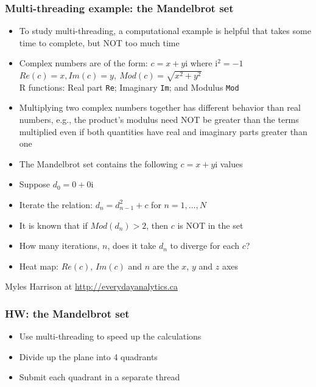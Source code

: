 \documentclass[11pt,pdftex,dvipsnames,usenames,helvetica]{beamer}
\begin{document}
\begin{frame}[fragile]
\frametitle{Multi-threading example: the Mandelbrot set}

\begin{itemize}
\item To study multi-threading, a computational
example is helpful that takes some time to complete, but NOT too much time
\item Complex numbers are of the form: $c=x+y\mathrm{i}$
where $\mathrm{i}^2=-1$\\
$Re(c)=x, Im(c)=y,\ Mod(c)=\sqrt{x^2+y^2}$\\
R functions: Real part {\tt Re}; Imaginary {\tt Im}; and Modulus {\tt Mod}
\item Multiplying two complex numbers together has
  different behavior than real numbers, e.g., the product's modulus 
 need NOT be greater than the terms multiplied
  even if both quantities have real and imaginary parts greater than one
\item The Mandelbrot set contains the following $c=x+y\mathrm{i}$ values
\item Suppose $d_0=0+0\mathrm{i}$
\item Iterate the relation: $d_{n}=d_{n-1}^2+c$ for $n=1, \dots, N$ 
\item It is known that if $Mod(d_n)>2$, then $c$ is NOT in the set
\item How many iterations, $n$, does it take $d_n$ to
  diverge for each $c$?
\item Heat map: $Re(c)$, $Im(c)$ and $n$ are the $x$, $y$ and $z$ axes
\end{itemize}
Myles Harrison at \url{http://everydayanalytics.ca}
\end{frame}

\begin{frame}[fragile]
\frametitle{HW: the Mandelbrot set}

\begin{itemize}
\item Use multi-threading to speed up the calculations
\item Divide up the plane into 4 quadrants
\item Submit each quadrant in a separate thread 
\end{itemize}
\end{frame}
\end{document}
